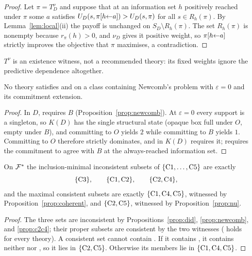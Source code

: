 \begin{proof}
Let $\pi=T^\nu_D$ and suppose that at an information set $h$ positively reached under $\pi$ some $a$
satisfies $U_D(s,\pi[h{\leftarrow}a])>U_D(s,\pi)$ for all $s\in R_h(\pi)$. By Lemma~\ref{lem:local}(ii)
the payoff is unchanged on $S_D\setminus R_h(\pi)$. The set $R_h(\pi)$ is nonempty because
$r_\pi(h)>0$, and $\nu_D$ gives it positive weight, so $\pi[h{\leftarrow}a]$ strictly improves the
objective that $\pi$ maximises, a contradiction.
\end{proof}

$T^\nu$ is an existence witness, not a recommended theory: its fixed weights ignore the
predictive dependence altogether.

\begin{proposition}\label{prop:c2c4}
No theory satisfies  and  on a class containing Newcomb's problem with $\varepsilon=0$
and its commitment extension.
\end{proposition}

\begin{proof}
In $D$,  requires $B$ (Proposition~\ref{prop:newcomb}). At $\varepsilon=0$ every support is a
singleton, so $K(D)$ has the single structural state (opaque box full under $O$, empty under $B$),
and committing to $O$ yields $2$ while committing to $B$ yields $1$. Committing to $O$ therefore
strictly dominates, and  in $K(D)$ requires it;  requires the commitment to agree with
$B$ at the always-reached information set.
\end{proof}

\begin{theorem}\label{thm:map15}
On $\mathcal{F}^*$ the inclusion-minimal inconsistent subsets of $\{\textup{C1},\dots,\textup{C5}\}$ are exactly
\[
  \{\textup{C3}\},\qquad\{\textup{C1},\textup{C2}\},\qquad\{\textup{C2},\textup{C4}\},
\]
and the maximal consistent subsets are exactly $\{\textup{C1},\textup{C4},\textup{C5}\}$, witnessed by
Proposition~\ref{prop:coherent}, and $\{\textup{C2},\textup{C5}\}$, witnessed by
Proposition~\ref{prop:nu}.
\end{theorem}

\begin{proof}
The three sets are inconsistent by Propositions~\ref{prop:did}, \ref{prop:newcomb}, and
\ref{prop:c2c4}; their proper subsets are consistent by the two witnesses ( holds for every
theory). A consistent set cannot contain . If it contains , it contains neither 
nor , so it lies in $\{\textup{C2},\textup{C5}\}$. Otherwise its members lie in
$\{\textup{C1},\textup{C4},\textup{C5}\}$.
\end{proof}

